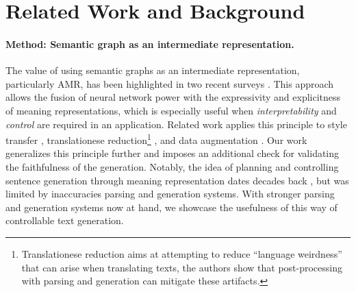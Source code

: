 \section{Related Work and Background}
\label{sec:rw}

\paragraph{Method: Semantic graph as an intermediate representation.} The value of using semantic graphs as an intermediate representation, particularly AMR, has been highlighted in two recent surveys \citep{sadeddine-etal-2024-survey, wein-opitz-2024-survey}. This approach allows the fusion of neural network power with the expressivity and explicitness of meaning representations, which is especially useful when \textit{interpretability} and \textit{control} are required in an application. Related work applies this principle to style transfer \citep{jangra-etal-2022-star}, translationese reduction\footnote{Translationese reduction aims at attempting to reduce ``language weirdness'' that can arise when translating texts, the authors show that post-processing with parsing and generation can mitigate these artifacts.} \citep{wein-schneider-2024-lost}, and data augmentation \citep{shou-etal-2022-amr, shou-lin-2023-evaluate, ghosh-etal-2024-abex}. Our work generalizes this principle further and imposes an additional check for validating the faithfulness of the generation. Notably, the idea of planning and controlling sentence generation through meaning representation dates decades back \citep[i.a.,][]{sondheimer-nebel-1986-logical, mann1986systemic, kasper-1989-flexible, wijnen1990development, bateman1990interfacing}, but was limited by inaccuracies parsing and generation systems. With stronger parsing and generation systems now at hand, we showcase the usefulness of this way of controllable text generation.

